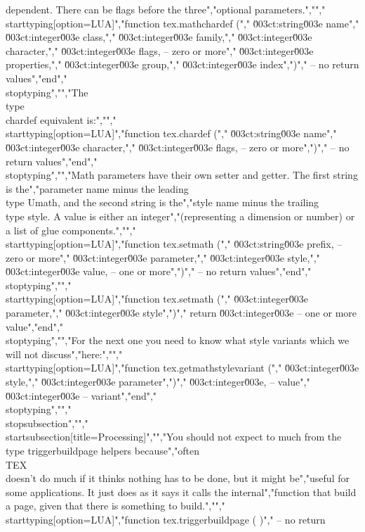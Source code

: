 dependent. There can be flags before the three","optional parameters.","","\\starttyping[option=LUA]","function tex.mathchardef (","    \u003ct:string\u003e  name","    \u003ct:integer\u003e class,","    \u003ct:integer\u003e family,","    \u003ct:integer\u003e character,","    \u003ct:integer\u003e flags,  -- zero or more","    \u003ct:integer\u003e properties,","    \u003ct:integer\u003e group,","    \u003ct:integer\u003e index",")","    -- no return values","end","\\stoptyping","","The \\type {\\chardef} equivalent is:","","\\starttyping[option=LUA]","function tex.chardef (","    \u003ct:string\u003e  name","    \u003ct:integer\u003e character,","    \u003ct:integer\u003e flags,  -- zero or more",")","    -- no return values","end","\\stoptyping","","Math parameters have their own setter and getter. The first string is the","parameter name minus the leading \\type {Umath}, and the second string is the","style name minus the trailing \\type {style}. A value is either an integer","(representing a dimension or number) or a list of glue components.","","\\starttyping[option=LUA]","function tex.setmath (","    \u003ct:string\u003e  prefix, -- zero or more","    \u003ct:integer\u003e parameter,","    \u003ct:integer\u003e style,","    \u003ct:integer\u003e value,  -- one or more",")","    -- no return values","end","\\stoptyping","","\\starttyping[option=LUA]","function tex.setmath (","    \u003ct:integer\u003e parameter,","    \u003ct:integer\u003e style",")","    return \u003ct:integer\u003e -- one or more value","end","\\stoptyping","","For the next one you need to know what style variants which we will not discuss","here:","","\\starttyping[option=LUA]","function tex.getmathstylevariant (","    \u003ct:integer\u003e style,","    \u003ct:integer\u003e parameter",")","    \u003ct:integer\u003e, -- value","    \u003ct:integer\u003e  -- variant","end","\\stoptyping","","\\stopsubsection","","\\startsubsection[title=Processing]","","You should not expect to much from the \\type {triggerbuildpage} helpers because","often \\TEX\\ doesn't do much if it thinks nothing has to be done, but it might be","useful for some applications. It just does as it says it calls the internal","function that build a page, given that there is something to build.","","\\starttyping[option=LUA]","function tex.triggerbuildpage ( )","    -- no return 